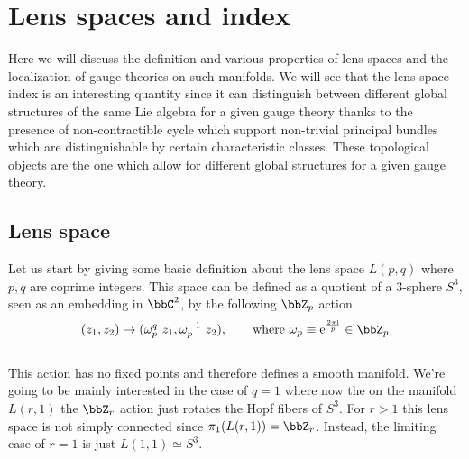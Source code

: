 \chapter{Lens spaces and index}
Here we will discuss the definition and various properties of lens spaces and the localization of gauge theories on such manifolds. We will see that the lens space index is an interesting quantity since it can distinguish between different global structures of the same Lie algebra for a given gauge theory thanks to the presence of non-contractible cycle which support non-trivial principal bundles which are distinguishable by certain characteristic classes. These topological objects are the one which allow for different global structures for a given gauge theory.
\section{Lens space}
Let us start by giving some basic definition about the lens space $L(p,q)$ where $p,q$ are coprime integers. This space can be defined as a quotient of a $3$-sphere $S^3$, seen as an embedding in $\bbC^2$, by the following $\bbZ_p$ action
\begin{equation}
	(z_1,z_2)\rightarrow (\omega^q_p~z_1,\omega^{-1}_p~z_2),\qquad\text{where } \omega_p\equiv \ee^{\frac{2\pi\I}{p}}\in\bbZ_p
\end{equation}
{\color{red}{Consider adding definition as a Seifert fibration over a punctured Riemann surface}}\\
This action has no fixed points and therefore defines a smooth manifold. We're going to be mainly interested in the case of $q=1$ where now the on the manifold $L(r,1)$ the $\bbZ_r$ action just rotates the Hopf fibers of $S^3$. For $r>1$ this lens space is not simply connected since $\pi_1(L(r,1))=\bbZ_r$. Instead, the limiting case of $r=1$ is just $L(1,1)\simeq S^3$. 
